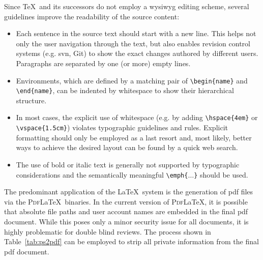 Since \TeX\ and its successors do not employ a \gls{wysiwyg} editing scheme, several guidelines improve the readability of the source content:
\begin{itemize}
\item Each sentence in the source text should start with a new line.
      This helps not only the user navigation through the text, but also enables revision control systems (e.g. \gls{svn}, Git) to show the exact changes authored by different users.
      Paragraphs are separated by one (or more) empty lines.
\item Environments, which are defined by a matching pair of \verb|\begin{name}| and \verb|\end{name}|, can be indented by whitespace to show their hierarchical structure.
\item In most cases, the explicit use of whitespace (e.g. by adding \verb|\hspace{4em}| or \verb|\vspace{1.5cm}|) violates typographic guidelines and rules.
      Explicit formatting should only be employed as a last resort and, most likely, better ways to achieve the desired layout can be found by a quick web search.
\item The use of bold or italic text is generally not supported by typographic considerations and the semantically meaningful \verb|\emph{|\texttt{$\dots$}\verb|}| should be used.
\end{itemize}

The predominant application of the \LaTeX\ system is the generation of \gls{pdf} files via the \textsc{Pdf}\LaTeX\ binaries.
In the current version of \textsc{Pdf}\LaTeX, it is possible that absolute file paths and user account names are embedded in the final \gls{pdf} document.
While this poses only a minor security issue for all documents, it is highly problematic for double blind reviews.
The process shown in Table~\ref{tab:ps2pdf} can be employed to strip all private information from the final \gls{pdf} document.

